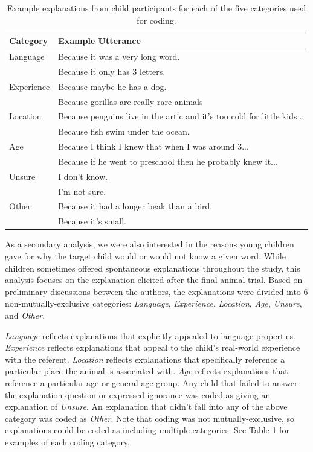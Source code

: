 \documentclass[10pt, letterpaper]{article}
\begin{document}
\begin{table}[tb]
\centering
\begin{tabular}{ll}
  \hline
Category & Example Utterance \\ 
  \hline
Language & Because it was a very long word. \\ 
    & Because it only has 3 letters. \\ 
  Experience & Because maybe he has a dog. \\ 
    & Because gorillas are really rare animals \\ 
  Location & Because penguins live in the artic and it's too cold for little kids... \\ 
    & Because fish swim under the ocean. \\ 
  Age & Because I think I knew that when I was around 3... \\ 
    & Because if he went to preschool then he probably knew it... \\ 
  Unsure & I don't know. \\ 
    & I'm not sure. \\ 
  Other & Because it had a longer beak than a bird. \\ 
    & Because it's small. \\ 
   \hline
\end{tabular}
\caption{Example explanations from child participants for each of the five categories used for coding.} 
\label{tab:explanations_table}
\end{table}

As a secondary analysis, we were also interested in the reasons young
children gave for why the target child would or would not know a given
word. While children sometimes offered spontaneous explanations
throughout the study, this analysis focuses on the explanation elicited
after the final animal trial. Based on preliminary discussions between
the authors, the explanations were divided into 6 non-mutually-exclusive
categories: \emph{Language}, \emph{Experience}, \emph{Location},
\emph{Age}, \emph{Unsure}, and \emph{Other}.

\emph{Language} reflects explanations that explicitly appealed to
language properties. \emph{Experience} reflects explanations that appeal
to the child's real-world experience with the referent. \emph{Location}
reflects explanations that specifically reference a particular place the
animal is associated with. \emph{Age} reflects explanations that
reference a particular age or general age-group. Any child that failed
to answer the explanation question or expressed ignorance was coded as
giving an explanation of \emph{Unsure}. An explanation that didn't fall
into any of the above category was coded as \emph{Other}. Note that
coding was not mutually-exclusive, so explanations could be coded as
including multiple categories. See Table \ref{tab:explanations_table}
for examples of each coding category.
\end{document}
